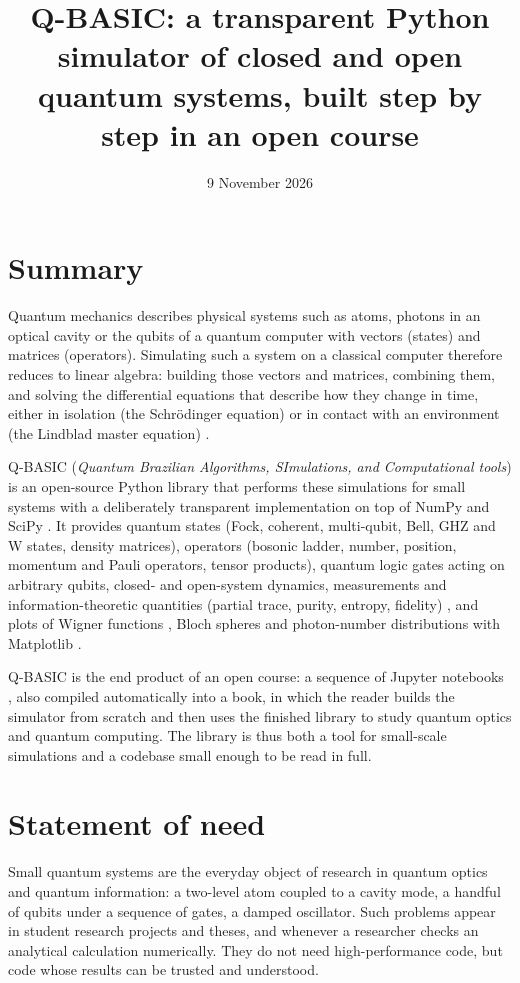 \documentclass[
]{article}
\title{Q-BASIC: a transparent Python simulator of closed and open
quantum systems, built step by step in an open course}
\author{}
\date{9 November 2026}
\begin{document}
\maketitle

\section{Summary}\label{summary}

Quantum mechanics describes physical systems such as atoms, photons in
an optical cavity or the qubits of a quantum computer with vectors
(states) and matrices (operators). Simulating such a system on a
classical computer therefore reduces to linear algebra: building those
vectors and matrices, combining them, and solving the differential
equations that describe how they change in time, either in isolation
(the Schrödinger equation) or in contact with an environment (the
Lindblad master equation) \citep{lindblad1976, gorini1976}.

Q-BASIC (\emph{Quantum Brazilian Algorithms, SImulations, and
Computational tools}) is an open-source Python library that performs
these simulations for small systems with a deliberately transparent
implementation on top of NumPy \citep{harris2020numpy} and SciPy
\citep{virtanen2020scipy}. It provides quantum states (Fock, coherent,
multi-qubit, Bell, GHZ and W states, density matrices), operators
(bosonic ladder, number, position, momentum and Pauli operators, tensor
products), quantum logic gates acting on arbitrary qubits, closed- and
open-system dynamics, measurements and information-theoretic quantities
(partial trace, purity, entropy, fidelity) \citep{nielsen2010}, and
plots of Wigner functions \citep{wigner1932, cahill1969}, Bloch spheres
and photon-number distributions with Matplotlib
\citep{hunter2007matplotlib}.

Q-BASIC is the end product of an open course: a sequence of Jupyter
notebooks \citep{kluyver2016jupyter}, also compiled automatically into a
book, in which the reader builds the simulator from scratch and then
uses the finished library to study quantum optics and quantum computing.
The library is thus both a tool for small-scale simulations and a
codebase small enough to be read in full.

\section{Statement of need}\label{statement-of-need}

Small quantum systems are the everyday object of research in quantum
optics and quantum information: a two-level atom coupled to a cavity
mode, a handful of qubits under a sequence of gates, a damped
oscillator. Such problems appear in student research projects and
theses, and whenever a researcher checks an analytical calculation
numerically. They do not need high-performance code, but code whose
results can be trusted and understood.
\end{document}

